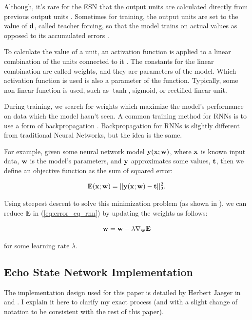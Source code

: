 \documentclass{article}
\begin{document}
Although, it's rare for the ESN that the output units are calculated
directly from previous output
units \cite{jaeger2002tutorial}. Sometimes for training, the output units are
set to the value of $\mathbf{d}$, called teacher forcing, so that the model trains on
actual values as opposed to its accumulated errors \cite{jaeger2002tutorial}.

To calculate the value of a unit, an activation function is applied to a
linear combination of the units connected to it
\cite{svozil1997introduction}. The constants for the linear combination are
called weights, and they are parameters of the model. Which activation
function is used is also a parameter of the function. Typically, some
non-linear function is used, such as $\tanh$, sigmoid, or rectified linear
unit.

During training, we search for weights which maximize the model's performance
on data which the model hasn't seen. A common training method for RNNs is to
use a form of backpropagation \cite{jaeger2002tutorial}. Backpropagation for
RNNs is slightly different from traditional Neural Networks, but the idea is
the same.

For example, given some neural network model $\mathbf{y}(\mathbf{x}; \mathbf{w})$, where $\mathbf{x}$ is
known input data, $\mathbf{w}$ is the model's parameters, and $\mathbf{y}$ approximates
some values, $\mathbf{t}$, then we define an objective function as the sum of
squared error:

\newcommand{\Ev}{\mathbf{E}}

\begin{equation}
    \Ev(\xv; \wv) = \vert \vert \yv(\xv; \wv) - \tv \vert \vert_2^2.
    \label{eq:error_eq_rnn}
\end{equation}

Using steepest descent to solve this minimization problem (as shown in
\cite{svozil1997introduction}), we can reduce $\Ev$ in
(\ref{eq:error_eq_rnn}) by updating the weights as follows:

\begin{equation}
    \wv = \wv - \lambda \nabla_\wv \Ev
\end{equation}

for some learning rate $\lambda$.

\subsection{Echo State Network Implementation}

The implementation design used for this paper is detailed by Herbert Jaeger
in \cite{jaeger2002tutorial} and \cite{jaeger2007echo}. I explain it here to
clarify my exact process (and with a slight change of notation to be
consistent with the rest of this paper).
\end{document}
